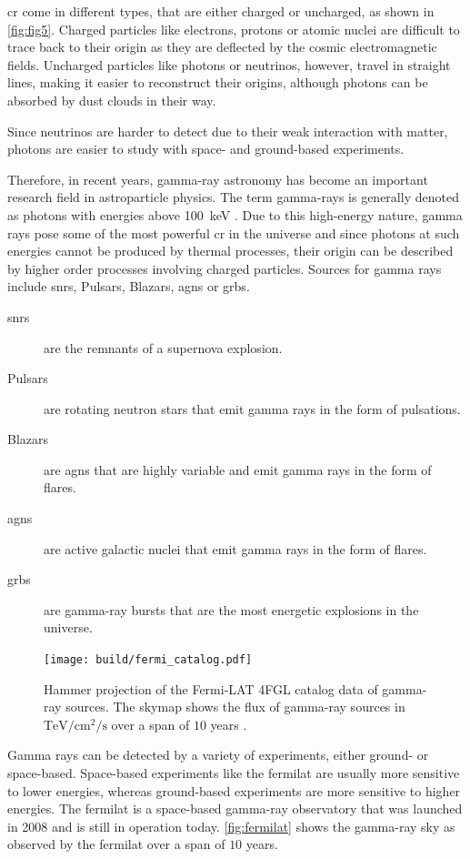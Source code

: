 \gls{cr} come in different types, that are either charged or uncharged, as shown in \autoref{fig:fig5}.
Charged particles like electrons, protons or atomic nuclei are difficult to trace back to their origin
as they are deflected by the cosmic electromagnetic fields. Uncharged particles like photons or
neutrinos, however, travel in straight lines, making it easier to reconstruct their origins,
although photons can be absorbed by dust clouds in their way.

Since neutrinos are harder to detect due to their weak interaction with matter, photons are easier to study
with space- and ground-based experiments.

Therefore, in recent years, gamma-ray astronomy has become an important research field in astroparticle physics.
The term gamma-rays is generally denoted as photons with energies above \SI{100}{\kilo\eV}
\cite{funk}. Due to this high-energy nature, gamma rays pose some of the most powerful \gls{cr} in
the universe and since photons at such energies cannot be produced by thermal processes, their origin
can be described by higher order processes involving charged particles. Sources for gamma rays include
\glspl{snr}, Pulsars, Blazars, \glspl{agn} or \glspl{grb}.

\begin{description}
    \item [\glspl{snr}] are the remnants of a supernova explosion.
    \item [Pulsars] are rotating neutron stars that emit gamma rays in the form of pulsations.
    \item [Blazars] are \glspl{agn} that are highly variable and emit gamma rays in the form of
    flares.
    \item [\glspl{agn}] are active galactic nuclei that emit gamma rays in the form of flares.
    \item [\glspl{grb}] are gamma-ray bursts that are the most energetic explosions in the universe.
\end{description}

\begin{figure}
    \centering
    \texttt{[image: build/fermi\_catalog.pdf]}
    \caption{Hammer projection of the Fermi-LAT 4FGL catalog data of gamma-ray sources. The skymap
    shows the flux of gamma-ray sources in \(\si{\tera\eV\per\centi\meter\squared\per\second}\)
    over a span of \(\num{10}\) years \cite{fermi4fgl}.}
    \label{fig:fermilat}
\end{figure}
Gamma rays can be detected by a variety of experiments, either ground- or space-based. Space-based
experiments like the \gls{fermilat} are usually more sensitive to lower energies, whereas ground-based experiments are more
sensitive to higher energies. The \gls{fermilat} is a space-based gamma-ray observatory that was launched
in 2008 and is still in operation today. \autoref{fig:fermilat} shows the gamma-ray sky as observed by the
\gls{fermilat} over a span of \(\num{10}\) years.

